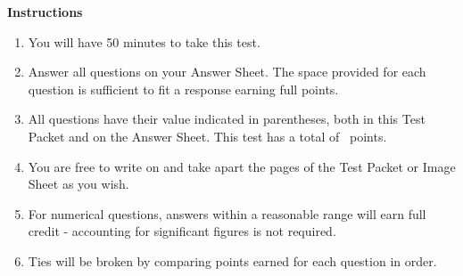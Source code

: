 \documentclass{scioly-exam-template-araneesh}
\begin{document}
\begin{large}
\begin{center} \textbf{\Large Instructions} \end{center}
\begin{enumerate}
    \itemsep-0.25em
    \item You will have 50 minutes to take this test.
    \item Answer all questions on your Answer Sheet. The space provided for each question is sufficient to fit a response earning full points.
    \item All questions have their value indicated in parentheses, both in this Test Packet and on the Answer Sheet. This test has a total of \sumpoints~points.
    \item You are free to write on and take apart the pages of the Test Packet or Image Sheet as you wish.
    \item For numerical questions, answers within a reasonable range will earn full credit - accounting for significant figures is not required.
    \item Ties will be broken by comparing points earned for each question in order.
\end{enumerate}
\end{large}
\pagebreak

\begin{multicols}{2}
\begin{enumerate}
\begin{large}


\vfill\null
\label{LastPageRef}

\end{large}
\end{enumerate}
\end{multicols}
\end{document}

